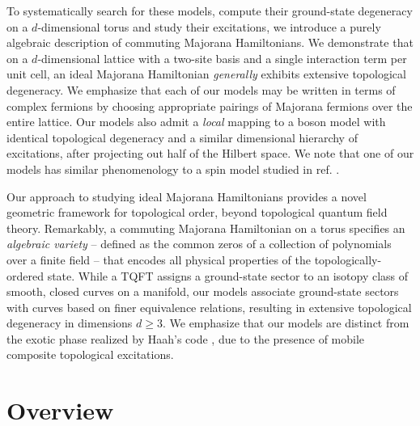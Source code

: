 \documentclass[aps,twocolumn,preprintnumbers,floatfix,showpacs,prx]{revtex4-1}
\begin{document}
To systematically search for these models, compute their ground-state degeneracy on a $d$-dimensional torus and study their excitations,
we introduce a purely algebraic description of commuting Majorana Hamiltonians. 
We demonstrate that on a $d$-dimensional lattice with a two-site basis and a single interaction term per unit cell,
an ideal Majorana Hamiltonian \emph{generally} exhibits extensive topological degeneracy.
We emphasize that each of our models may be written in terms of complex fermions by choosing appropriate pairings of Majorana fermions over the entire lattice.  Our models also admit a \emph{local} mapping to a boson model with identical topological degeneracy and a similar dimensional hierarchy of excitations, after projecting out half of the Hilbert space.  We note that one of our models has similar phenomenology to a spin model studied in ref. \cite{Bravyi, Chamon}.

Our approach to studying ideal Majorana Hamiltonians
provides a novel geometric framework for topological order, 
beyond topological quantum field theory.
Remarkably, a commuting Majorana Hamiltonian on a torus specifies an \emph{algebraic variety}
-- defined as the common zeros of a collection of polynomials over a finite field -- 
that encodes all physical properties of the topologically-ordered state.
While a TQFT assigns a ground-state sector to an isotopy class of smooth,
closed curves on a manifold, our models associate ground-state sectors with curves based on finer equivalence relations,
resulting in extensive topological degeneracy in dimensions $d \ge 3$.
We emphasize that our models are distinct from the exotic phase realized by Haah's code \cite{Haah_Code},
due to the presence of mobile composite %
topological excitations.

\section{Overview}
\label{sec:overview}
\end{document}
